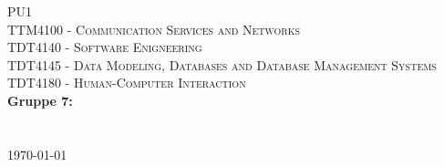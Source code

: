 \begin{titlepage}
\begin{center} 

\vspace*{3cm}
\textsc{\Huge PU1}\\[0.7cm]
\textsc{\medium TTM4100 - Communication Services and Networks}\\[0.3cm]
\textsc{\medium TDT4140 - Software Enigneering}\\[0.3cm]
\textsc{\medium TDT4145 - Data Modeling, Databases and Database Management Systems}\\[0.3cm]
\textsc{\medium TDT4180 - Human-Computer Interaction}\\[0.3cm]

\textbf{\Large Gruppe 7:} \\[0.2cm]
 \\
\\[1cm] 

\today

\end{center}
\end{titlepage}
